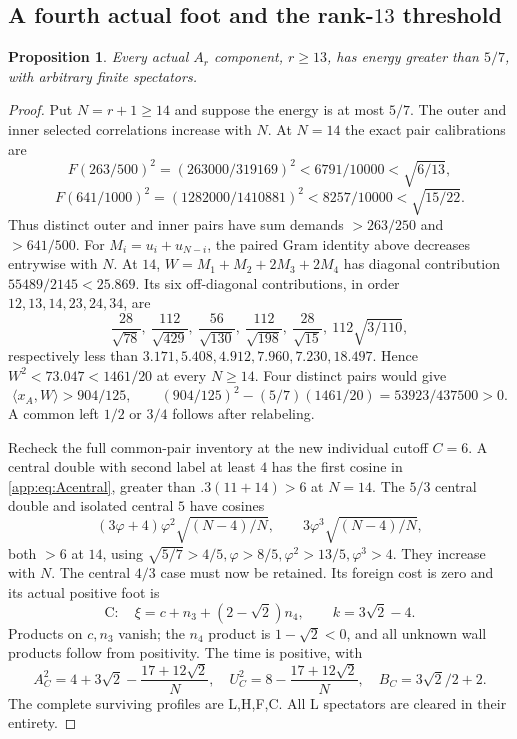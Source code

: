 \documentclass[11pt]{article}
\newtheorem{proposition}[theorem]{Proposition}
\theoremstyle{definition}
\theoremstyle{remark}
\newcommand{\ip}[2]{\langle #1,#2\rangle}
\begin{document}
\subsection{A fourth actual foot and the rank-\(13\) threshold}
\label{app:Afivesevenths}
\begin{proposition}
Every actual \(A_r\) component, \(r\geq13\), has energy
greater than \(5/7\), with arbitrary finite spectators.
\end{proposition}
\begin{proof}
Put \(N=r+1\geq14\) and suppose the energy is at most \(5/7\).
The outer and inner selected correlations increase with \(N\).
At \(N=14\) the exact pair calibrations are
\[
 F(263/500)^2=(263000/319169)^2
  <6791/10000<\sqrt{6/13},
\]
\[
 F(641/1000)^2=(1282000/1410881)^2
  <8257/10000<\sqrt{15/22}.
\]
Thus distinct outer and inner pairs have sum demands
\(>263/250\) and \(>641/500\).
For \(M_i=u_i+u_{N-i}\), the paired Gram identity above
decreases entrywise with \(N\).
At \(14\), \(W=M_1+M_2+2M_3+2M_4\) has diagonal
contribution \(55489/2145<25.869\). Its six off-diagonal
contributions, in order \(12,13,14,23,24,34\), are
\[
 \frac{28}{\sqrt{78}},\
 \frac{112}{\sqrt{429}},\
 \frac{56}{\sqrt{130}},\
 \frac{112}{\sqrt{198}},\
 \frac{28}{\sqrt{15}},\
 112\sqrt{3/110},
\]
respectively less than
\(3.171,5.408,4.912,7.960,7.230,18.497\).
Hence \(W^2<73.047<1461/20\) at every \(N\geq14\).
Four distinct pairs would give
\[
 \ip{x_A}{W}>904/125,\qquad
 (904/125)^2-(5/7)(1461/20)=53923/437500>0.
\]
A common left \(1/2\) or \(3/4\) follows after relabeling.

Recheck the full common-pair inventory at the new
individual cutoff \(C=6\). A central double with second
label at least \(4\) has the first cosine in
\eqref{app:eq:Acentral}, greater than
\(.3(11+14)>6\) at \(N=14\).
The \(5/3\) central double and isolated central \(5\)
have cosines
\[
 (3\varphi+4)\varphi^2\sqrt{(N-4)/N},
 \qquad3\varphi^3\sqrt{(N-4)/N},
\]
both \(>6\) at \(14\), using
\(\sqrt{5/7}>4/5,\varphi>8/5,\varphi^2>13/5,\varphi^3>4\).
They increase with \(N\).
The central \(4/3\) case must now be retained.
Its foreign cost is zero and its actual positive foot is
\[
 \mathrm C:\quad\xi=c+n_3+(2-\sqrt2)n_4,\qquad k=3\sqrt2-4.
\]
Products on \(c,n_3\) vanish; the \(n_4\) product is
\(1-\sqrt2<0\), and all unknown wall products follow
from positivity. The time is positive, with
\[
 A_C^2=4+3\sqrt2-\frac{17+12\sqrt2}{N},\quad
 U_C^2=8-\frac{17+12\sqrt2}{N},\quad B_C=3\sqrt2/2+2.
\]
The complete surviving profiles are L,H,F,C.
All L spectators are cleared in their entirety.


\end{proof}
\end{document}
